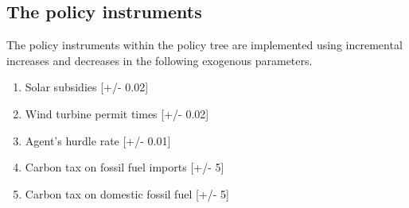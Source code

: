 

\subsection{The policy instruments}
\label{ssec:interfaceInstruments}

The policy instruments within the policy tree are implemented using incremental increases and decreases in the following exogenous parameters.

\begin{enumerate}
\item Solar subsidies [+/- 0.02]
\item Wind turbine permit times [+/- 0.02]
\item Agent's hurdle rate  [+/- 0.01]
\item Carbon tax on fossil fuel imports [+/- 5]
\item Carbon tax on domestic fossil fuel [+/- 5]
\end{enumerate}

